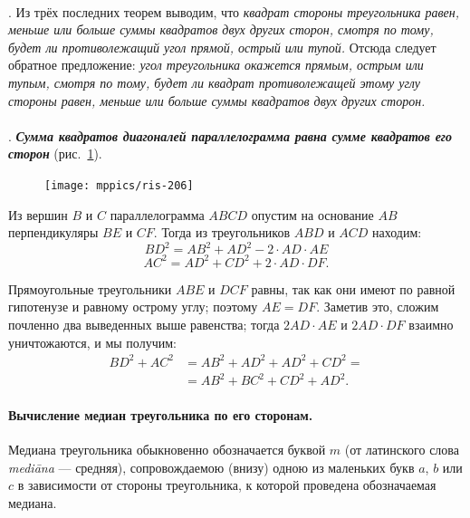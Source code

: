 \documentclass[oneside]{book}
\begin{document}
\paragraph{}\label{1938/196}
.
Из трёх последних теорем выводим, что \emph{квадрат стороны треугольника равен, меньше или больше суммы квадратов двух других сторон, смотря по тому, будет ли противолежащий угол прямой, острый или тупой.}
Отсюда следует обратное предложение:
\emph{угол треугольника окажется прямым, острым или тупым, смотря по тому, будет ли квадрат противолежащей этому углу стороны равен, меньше или больше суммы квадратов двух других сторон.}

\paragraph{}\label{1938/197}
.
\textbf{\emph{Сумма квадратов диагоналей параллелограмма равна сумме квадратов его сторон}} (рис.~\ref{1938/ris-206}).

\begin{figure}
\centering
\texttt{[image: mppics/ris-206]}
\caption{}\label{1938/ris-206}
\end{figure}

Из вершин $B$ и $C$ параллелограмма $ABCD$ опустим на основание $AB$ перпендикуляры $BE$ и $CF$.
Тогда из треугольников $ABD$ и $ACD$ находим:
\[BD^2=AB^2+AD^2-2\cdot AD\cdot AE\]
\[AC^2=AD^2+CD^2+2\cdot AD\cdot  DF.\]

{\sloppy

Прямоугольные треугольники $ABE$ и $DCF$ равны, так как они имеют по равной гипотенузе и равному острому углу;
поэтому $AE=DF$.
Заметив это, сложим почленно два выведенных выше равенства;
тогда $2AD\cdot  AE$ и $2AD\cdot  DF$ взаимно уничтожаются, и мы получим:
\begin{align*}
BD^2+AC^2&=AB^2+AD^2+AD^2+CD^2=
\\
&=AB^2+BC^2+CD^2+AD^2.
\end{align*}

}

\paragraph{Вычисление медиан треугольника по его сторонам.}\label{1914/241}
Медиана треугольника обыкновенно обозначается буквой $m$ (от латинского слова \emph{mediāna} --- средняя), сопровождаемою (внизу) одною из маленьких букв $a$, $b$ или $c$ в зависимости от стороны треугольника, к которой проведена обозначаемая медиана.
\end{document}
